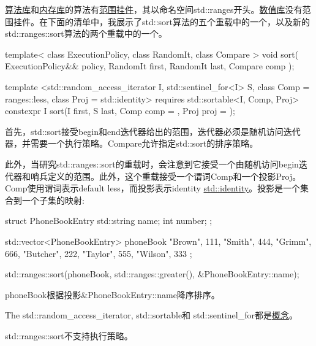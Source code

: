 \href{https://en.cppreference.com/w/cpp/header/algorithm}{算法库}和\href{https://en.cppreference.com/w/cpp/header/memory}{内存库}的算法有\href{https://en.cppreference.com/w/cpp/algorithm/ranges}{范围挂件}，其以命名空间std::ranges开头。\href{https://en.cppreference.com/w/cpp/header/numeric}{数值库}没有范围挂件。在下面的清单中，我展示了std::sort算法的五个重载中的一个，以及新的std::ranges::sort算法的两个重载中的一个。

\begin{cpp}
template< class ExecutionPolicy, class RandomIt, class Compare >
void sort( ExecutionPolicy&& policy,
		   RandomIt first, RandomIt last, Compare comp );

template <std::random_access_iterator I, std::sentinel_for<I> S,
		class Comp = ranges::less, class Proj = std::identity>
requires std::sortable<I, Comp, Proj>
constexpr I sort(I first, S last, Comp comp = {}, Proj proj = {});
\end{cpp}

首先，std::sort接受begin和end迭代器给出的范围，迭代器必须是随机访问迭代器，并需要一个执行策略。Compare允许指定std::sort的排序策略。

此外，当研究std::ranges::sort的重载时，会注意到它接受一个由随机访问begin迭代器和哨兵定义的范围。此外，这个重载接受一个谓词Comp和一个投影Proj。Comp使用谓词表示default less，而投影表示identity \href{https://en.cppreference.com/w/cpp/utility/functional/identity}{std::identity}。投影是一个集合到一个子集的映射:

\begin{cpp}
struct PhoneBookEntry{
	std::string name;
	int number;
};

std::vector<PhoneBookEntry> phoneBook{ {"Brown", 111}, {"Smith", 444}, {"Grimm", 666},
							{"Butcher", 222}, {"Taylor", 555}, {"Wilson", 333} };
							
std::ranges::sort(phoneBook, std::ranges::greater(), &PhoneBookEntry::name);
\end{cpp}

phoneBook根据投影\&PhoneBookEntry::name降序排序。

The std::random\_access\_iterator, std::sortable和 std::sentinel\_for都是\href{https://www.modernescpp.com/index.php/tag/concepts}{概念}。

std::ranges::sort不支持执行策略。



































